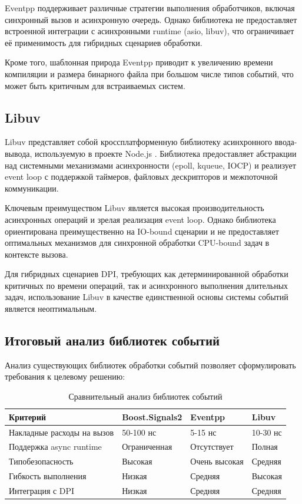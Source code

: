 \documentclass[12pt,a4paper]{report}
\begin{document}
Eventpp поддерживает различные стратегии выполнения обработчиков, включая синхронный вызов и асинхронную очередь. Однако библиотека не предоставляет встроенной интеграции с асинхронными runtime (asio, libuv), что ограничивает её применимость для гибридных сценариев обработки.

Кроме того, шаблонная природа Eventpp приводит к увеличению времени компиляции и размера бинарного файла при большом числе типов событий, что может быть критичным для встраиваемых систем.

\subsection{Libuv}
Libuv представляет собой кроссплатформенную библиотеку асинхронного ввода-вывода, используемую в проекте Node.js \cite{libuv2023}. Библиотека предоставляет абстракции над системными механизмами асинхронности (epoll, kqueue, IOCP) и реализует event loop с поддержкой таймеров, файловых дескрипторов и межпоточной коммуникации.

Ключевым преимуществом Libuv является высокая производительность асинхронных операций и зрелая реализация event loop. Однако библиотека ориентирована преимущественно на IO-bound сценарии и не предоставляет оптимальных механизмов для синхронной обработки CPU-bound задач в контексте вызова.

Для гибридных сценариев DPI, требующих как детерминированной обработки критичных по времени операций, так и асинхронного выполнения длительных задач, использование Libuv в качестве единственной основы системы событий является неоптимальным.

\subsection{Итоговый анализ библиотек событий}
Анализ существующих библиотек обработки событий позволяет сформулировать требования к целевому решению:

\begin{table}[H]
\centering
\caption{Сравнительный анализ библиотек событий}
\label{tab:libs_comparison}
\begin{tabularx}{\textwidth}{lXXX}
\toprule
\textbf{Критерий} & \textbf{Boost.Signals2} & \textbf{Eventpp} & \textbf{Libuv} \\
\midrule
Накладные расходы на вызов & 50-100 нс & 5-15 нс & 10-30 нс \\
Поддержка async runtime & Ограниченная & Отсутствует & Полная \\
Типобезопасность & Высокая & Очень высокая & Средняя \\
Гибкость выполнения & Низкая & Средняя & Высокая \\
Интеграция с DPI & Низкая & Средняя & Средняя \\
\bottomrule
\end{tabularx}
\end{table}
\end{document}
